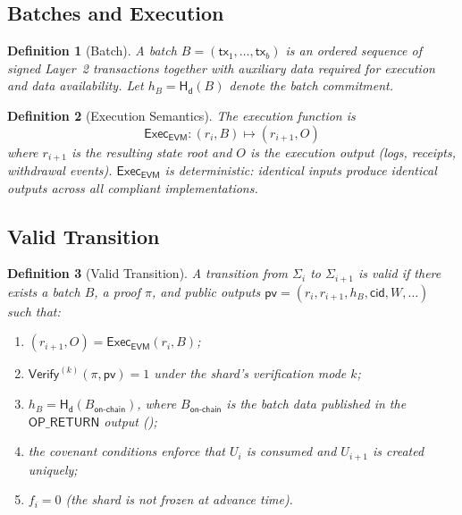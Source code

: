 \documentclass[11pt,a4paper]{article}
\newtheorem{definition}{Definition}[section]
\newcommand{\Hashd}{\mathsf{H_d}}        %
\newcommand{\Verify}{\mathsf{Verify}}
\newcommand{\Exec}{\mathsf{Exec}}
\newcommand{\EVM}{\mathsf{EVM}}
\begin{document}
\subsection{Batches and Execution}

\begin{definition}[Batch]\label{def:batch}
A batch $B = (\mathsf{tx}_1, \ldots, \mathsf{tx}_b)$ is an ordered sequence of signed Layer~2 transactions together with auxiliary data required for execution and data availability. Let $h_B = \Hashd(B)$ denote the batch commitment.
\end{definition}

\begin{definition}[Execution Semantics]\label{def:exec}
The execution function is
\[
    \Exec_{\EVM} : (r_i, B) \mapsto (r_{i+1}, O)
\]
where $r_{i+1}$ is the resulting state root and $O$ is the execution output (logs, receipts, withdrawal events). $\Exec_{\EVM}$ is deterministic: identical inputs produce identical outputs across all compliant implementations.
\end{definition}

\subsection{Valid Transition}

\begin{definition}[Valid Transition]\label{def:valid-transition}
A transition from $\Sigma_i$ to $\Sigma_{i+1}$ is \emph{valid} if there exists a batch $B$, a proof $\pi$, and public outputs $\mathsf{pv} = (r_i, r_{i+1}, h_B, \mathsf{cid}, W, \ldots)$ such that:
\begin{enumerate}[nosep,label=(V\arabic*)]
    \item $(r_{i+1}, O) = \Exec_{\EVM}(r_i, B)$;
    \item $\Verify^{(k)}(\pi, \mathsf{pv}) = 1$ under the shard's verification mode $k$;
    \item $h_B = \Hashd(B_{\mathsf{on\text{-}chain}})$, where $B_{\mathsf{on\text{-}chain}}$ is the batch data published in the $\mathsf{OP\_RETURN}$ output ();
    \item the covenant conditions enforce that $U_i$ is consumed and $U_{i+1}$ is created uniquely;
    \item $f_i = 0$ (the shard is not frozen at advance time).
\end{enumerate}
\end{definition}
\end{document}
